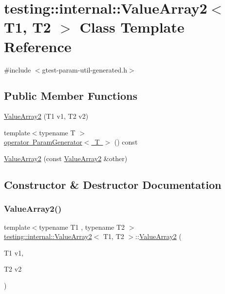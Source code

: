 \hypertarget{classtesting_1_1internal_1_1ValueArray2}{}\section{testing\+::internal\+::Value\+Array2$<$ T1, T2 $>$ Class Template Reference}
\label{classtesting_1_1internal_1_1ValueArray2}


{\ttfamily \#include $<$gtest-\/param-\/util-\/generated.\+h$>$}

\subsection*{Public Member Functions}
\begin{DoxyCompactItemize}
\item 
\mbox{\hyperlink{classtesting_1_1internal_1_1ValueArray2_af641714b9a06929e4dcabe8854d0da1c}{Value\+Array2}} (T1 v1, T2 v2)
\item 
{\footnotesize template$<$typename T $>$ }\\\mbox{\hyperlink{classtesting_1_1internal_1_1ValueArray2_aa81899f10bfd345c17aae540acc296a9}{operator Param\+Generator$<$ T $>$}} () const
\item 
\mbox{\hyperlink{classtesting_1_1internal_1_1ValueArray2_ac0da580bf4f38494da741c7140a7927d}{Value\+Array2}} (const \mbox{\hyperlink{classtesting_1_1internal_1_1ValueArray2}{Value\+Array2}} \&other)
\end{DoxyCompactItemize}


\subsection{Constructor \& Destructor Documentation}
\mbox{\label{classtesting_1_1internal_1_1ValueArray2_af641714b9a06929e4dcabe8854d0da1c}} 
\subsubsection{\texorpdfstring{ValueArray2()}{ValueArray2()}\hspace{0.1cm}{\footnotesize\ttfamily [1/2]}}
{\footnotesize\ttfamily template$<$typename T1 , typename T2 $>$ \\
\mbox{\hyperlink{classtesting_1_1internal_1_1ValueArray2}{testing\+::internal\+::\+Value\+Array2}}$<$ T1, T2 $>$\+::\mbox{\hyperlink{classtesting_1_1internal_1_1ValueArray2}{Value\+Array2}} (\begin{DoxyParamCaption}\item[{T1}]{v1,  }\item[{T2}]{v2 }\end{DoxyParamCaption})\hspace{0.3cm}{\ttfamily [inline]}}

